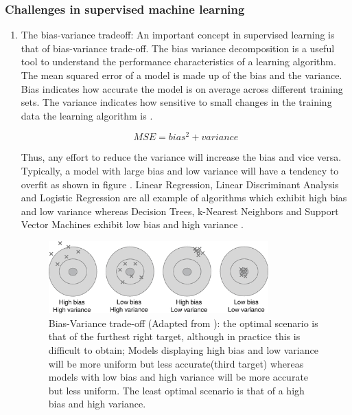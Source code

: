 \subsubsection{Challenges in supervised machine learning}
\begin{enumerate}
\item{The bias-variance tradeoff:}\newline
An important concept in supervised learning is that of bias-variance trade-off. The bias variance decomposition is a useful tool to understand the performance characteristics of a learning algorithm. The  mean squared error of a model is made up of the bias and the variance. Bias indicates how accurate the model is on average across different training sets. The variance indicates how sensitive to small changes in the training data the learning algorithm is \citep{Sammut:2016gd}.

\begin{equation}
        MSE = bias^2 + variance
\end{equation}

Thus, any effort to reduce the variance will increase the bias and vice versa. Typically, a model with large bias and low variance will have a tendency to overfit as shown in figure . Linear Regression, Linear Discriminant Analysis and Logistic Regression are all example of algorithms which exhibit high bias and low variance \citep{Anonymous:2016um} whereas Decision Trees, k-Nearest Neighbors and Support Vector Machines exhibit low bias and high variance \citep{Anonymous:2016um}.

\begin{figure}[H]
    \centering
    \includegraphics[width=0.8\textwidth]{ThesisTemplate/usingLatex/images/biasvariance.png}
    \caption{Bias-Variance trade-off (Adapted from \citep{Sammut:2017vv}): the optimal scenario is that of the furthest right target, although in practice this is difficult to obtain; Models displaying high bias and low variance will be more uniform but less accurate(third target) whereas models with low bias and high variance will be more accurate but less uniform. The least optimal scenario is that of a high bias and high variance.}
    \label{fig:biasVariance}
\end{figure}


\end{enumerate}
